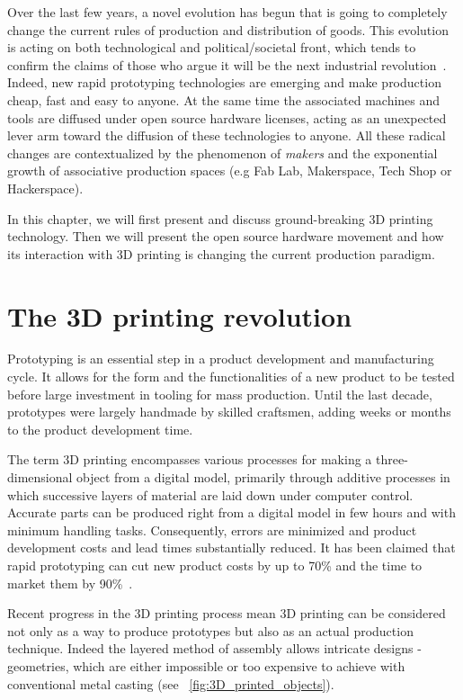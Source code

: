 Over the last few years, a novel evolution has begun that is going to completely change the current rules of production and distribution of goods. This evolution is acting on both technological and political/societal front, which tends to confirm the claims of those who argue it will be the next industrial revolution~\cite{anderson}. Indeed, new rapid prototyping technologies are emerging and make production cheap, fast and easy to anyone. At the same time the associated machines and tools are diffused under open source hardware licenses, acting as an unexpected lever arm toward the diffusion of these technologies to anyone. All these radical changes are contextualized by the phenomenon of \emph{makers} and the exponential growth of associative production spaces (e.g Fab Lab, Makerspace, Tech Shop or Hackerspace).

In this chapter, we will first present and discuss ground-breaking 3D printing technology. Then we will present the open source hardware movement and how its interaction with 3D printing is changing the current production paradigm.


\section{The 3D printing revolution} %

Prototyping is an essential step in a product development and manufacturing cycle. It allows for the form and the functionalities of a new product to be tested before large investment in tooling for mass production. Until the last decade, prototypes were largely handmade by skilled craftsmen, adding weeks or months to the product development time.

The term 3D printing  encompasses various processes for making a three-dimensional object from a digital model, primarily through additive processes in which successive layers of material are laid down under computer control.
Accurate parts can be produced right from a digital model in few hours and with minimum handling tasks. Consequently, errors are minimized and product development costs and lead times substantially reduced. It has been claimed that rapid prototyping can cut new product costs by up to 70\% and the time to market them by 90\%~\cite{waterman1994rapid}.

Recent progress in the 3D printing process mean 3D printing can be considered not only as a way to produce prototypes but also as an actual production technique. Indeed the layered method of assembly allows intricate designs - geometries, which are either impossible or too expensive to achieve with conventional metal casting (see \figurename~\ref{fig:3D_printed_objects}).


